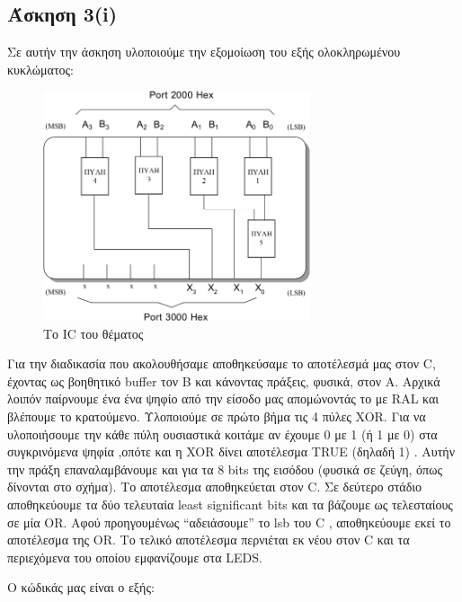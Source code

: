 \documentclass[a4paper,10pt]{article} \usepackage{anysize}
\begin{document}


\section*{} 
\subsection*{Άσκηση 3(i)}
Σε αυτήν την άσκηση υλοποιούμε την εξομοίωση του εξής ολοκληρωμένου
κυκλώματος:
\begin{figure}[h]
\centering
\includegraphics[width=0.7\textwidth]{files/ask_3_i_IC.png}
\caption{Το IC του θέματος}
\end{figure}
Για την διαδικασία που ακολουθήσαμε αποθηκεύσαμε το αποτέλεσμά μας στον C,
έχοντας ως βοηθητικό buffer τον B και κάνοντας πράξεις, φυσικά, στον Α. Αρχικά
λοιπόν παίρνουμε ένα ένα ψηφίο από την είσοδο μας απομώνοντάς το με RAL και
βλέπουμε το κρατούμενο. Υλοποιούμε σε πρώτο βήμα τις 4 πύλες XOR. Για να
υλοποιήσουμε την κάθε πύλη ουσιαστικά κοιτάμε αν έχουμε 0 με 1 (ή 1 με 0) στα
συγκρινόμενα ψηφία ,οπότε και η XOR δίνει αποτέλεσμα TRUE (δηλαδή 1) . Αυτήν
την πράξη επαναλαμβάνουμε και για τα 8 bits της εισόδου (φυσικά σε ζεύγη, όπως
δίνονται στο σχήμα). Το αποτέλεσμα αποθηκεύεται στον C. Σε δεύτερο στάδιο
αποθηκεύουμε τα δύο τελευταία least significant bits και τα βάζουμε ως
τελεσταίους σε μία OR. Αφού προηγουμένως “αδειάσουμε” το lsb του C ,
αποθηκεύουμε εκεί το αποτέλεσμα της OR. Το τελικό αποτέλεσμα περνιέται εκ νέου
στον C και τα περιεχόμενα του οποίου εμφανίζουμε στα LEDS.

Ο κώδικάς μας είναι ο εξής:
\inputminted[linenos,obeytabs,frame=leftline,fontsize=\footnotesize]{oldasm}{files/askhsh_3_i.8085}
\end{document}

